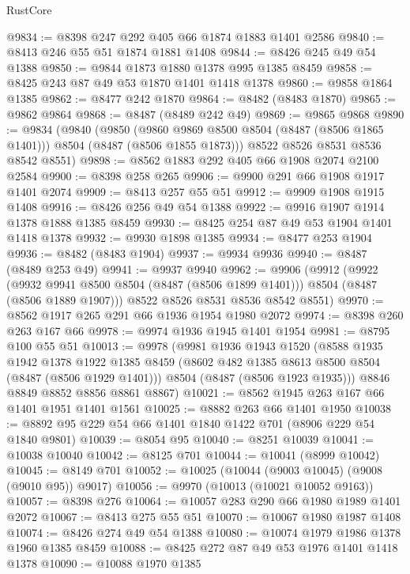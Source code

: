 \begin{lexlean}{RustCore}
\begin{coremodule}
@9834 := @8398 @247 @292 @405 @66 @1874 @1883 @1401 @2586
@9840 := @8413 @246 @55 @51 @1874 @1881 @1408
@9844 := @8426 @245 @49 @54 @1388
@9850 := @9844 @1873 @1880 @1378 @995 @1385 @8459
@9858 := @8425 @243 @87 @49 @53 @1870 @1401 @1418 @1378
@9860 := @9858 @1864 @1385
@9862 := @8477 @242 @1870
@9864 := @8482 (@8483 @1870)
@9865 := @9862 @9864
@9868 := @8487 (@8489 @242 @49)
@9869 := @9865 @9868
@9890 := @9834
    (@9840
      (@9850
        (@9860 @9869 @8500 @8504 (@8487 (@8506 @1865 @1401)))
        @8504
        (@8487 (@8506 @1855 @1873)))
      @8522
      @8526
      @8531
      @8536
      @8542
      @8551)
@9898 := @8562 @1883 @292 @405 @66 @1908 @2074 @2100 @2584
@9900 := @8398 @258 @265
@9906 := @9900 @291 @66 @1908 @1917 @1401 @2074
@9909 := @8413 @257 @55 @51
@9912 := @9909 @1908 @1915 @1408
@9916 := @8426 @256 @49 @54 @1388
@9922 := @9916 @1907 @1914 @1378 @1888 @1385 @8459
@9930 := @8425 @254 @87 @49 @53 @1904 @1401 @1418 @1378
@9932 := @9930 @1898 @1385
@9934 := @8477 @253 @1904
@9936 := @8482 (@8483 @1904)
@9937 := @9934 @9936
@9940 := @8487 (@8489 @253 @49)
@9941 := @9937 @9940
@9962 := @9906
    (@9912
      (@9922
        (@9932 @9941 @8500 @8504 (@8487 (@8506 @1899 @1401)))
        @8504
        (@8487 (@8506 @1889 @1907)))
      @8522
      @8526
      @8531
      @8536
      @8542
      @8551)
@9970 := @8562 @1917 @265 @291 @66 @1936 @1954 @1980 @2072
@9974 := @8398 @260 @263 @167 @66
@9978 := @9974 @1936 @1945 @1401 @1954
@9981 := @8795 @100 @55 @51
@10013 := @9978
    (@9981
      @1936
      @1943
      @1520
      (@8588
        @1935
        @1942
        @1378
        @1922
        @1385
        @8459
        (@8602 @482 @1385 @8613 @8500 @8504 (@8487 (@8506 @1929 @1401)))
        @8504
        (@8487 (@8506 @1923 @1935)))
      @8846
      @8849
      @8852
      @8856
      @8861
      @8867)
@10021 := @8562 @1945 @263 @167 @66 @1401 @1951 @1401 @1561
@10025 := @8882 @263 @66 @1401 @1950
@10038 := @8892 @95 @229 @54 @66 @1401 @1840 @1422 @701 (@8906 @229 @54 @1840 @9801)
@10039 := @8054 @95
@10040 := @8251 @10039
@10041 := @10038 @10040
@10042 := @8125 @701
@10044 := @10041 (@8999 @10042)
@10045 := @8149 @701
@10052 := @10025 (@10044 (@9003 @10045) (@9008 (@9010 @95)) @9017)
@10056 := @9970 (@10013 (@10021 @10052 @9163))
@10057 := @8398 @276
@10064 := @10057 @283 @290 @66 @1980 @1989 @1401 @2072
@10067 := @8413 @275 @55 @51
@10070 := @10067 @1980 @1987 @1408
@10074 := @8426 @274 @49 @54 @1388
@10080 := @10074 @1979 @1986 @1378 @1960 @1385 @8459
@10088 := @8425 @272 @87 @49 @53 @1976 @1401 @1418 @1378
@10090 := @10088 @1970 @1385

\end{coremodule}
\end{lexlean}
